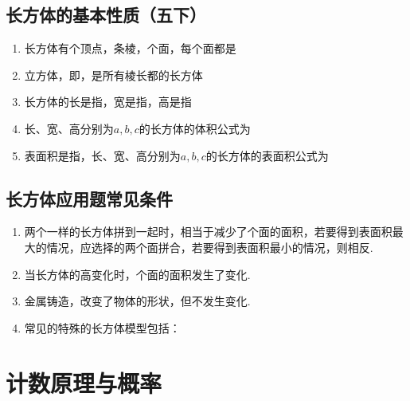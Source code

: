 \subsection*{长方体的基本性质（五下）}
\begin{enumerate}
    \item 长方体有个顶点，条棱，个面，每个面都是
    \item 立方体，即，是所有棱长都的长方体
    \item 长方体的长是指，宽是指，高是指
    \item 长、宽、高分别为$a, b, c$的长方体的体积公式为
    \item 表面积是指，长、宽、高分别为$a, b, c$的长方体的表面积公式为
\end{enumerate}

\subsection*{长方体应用题常见条件}
\begin{enumerate}
    \item 两个一样的长方体拼到一起时，相当于减少了个面的面积，若要得到表面积最大的情况，应选择的两个面拼合，若要得到表面积最小的情况，则相反.
    \item 当长方体的高变化时，个面的面积发生了变化.
    \item 金属铸造，改变了物体的形状，但不发生变化.
    \item 常见的特殊的长方体模型包括：
\end{enumerate}

\section*{计数原理与概率}

